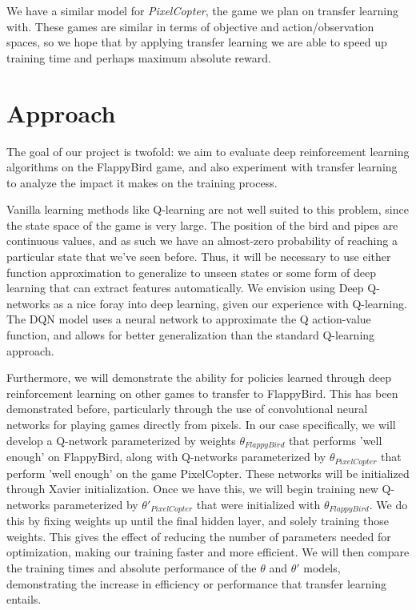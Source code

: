 \documentclass{article}
\begin{document}
We have a similar model for \textit{PixelCopter}, the game we plan on transfer learning with.
These games are similar in terms of objective and action/observation spaces, so we hope that by applying transfer learning we are able to speed up training time and perhaps maximum absolute reward.

\section{Approach}

The goal of our project is twofold: we aim to evaluate deep reinforcement learning algorithms on the FlappyBird game, and also experiment with transfer learning to analyze the impact it makes on the training process. 

Vanilla learning methods like Q-learning are not well suited to this problem, since the state space of the game is very large. The position of the bird and pipes are continuous values, and as such we have an almost-zero probability of reaching a particular state that we've seen before.
Thus, it will be necessary to use either function approximation to generalize to unseen states or some form of deep learning that can extract features automatically.
We envision using Deep Q-networks as a nice foray into deep learning, given our experience with Q-learning.
The DQN model uses a neural network to approximate the Q action-value function, and allows for better generalization than the standard Q-learning approach.

Furthermore, we will demonstrate the ability for policies learned through deep reinforcement learning on  other games to transfer to FlappyBird.
This has been demonstrated before, particularly through the use of convolutional neural networks for playing games directly from pixels. \cite{deepmind}
In our case specifically, we will develop a Q-network parameterized by weights $\theta_{FlappyBird}$ that performs 'well enough' on FlappyBird, along with Q-networks parameterized by $\theta_{PixelCopter}$ that perform 'well enough' on the game PixelCopter.
These networks will be initialized through Xavier initialization. \cite{xavier}
Once we have this, we will begin training new Q-networks parameterized by $\theta'_{PixelCopter}$ that were initialized with $\theta_{FlappyBird}$.
We do this by fixing weights up until the final hidden layer, and solely training those weights.
This gives the effect of reducing the number of parameters needed for optimization, making our training faster and more efficient.
We will then compare the training times and absolute performance of the $\theta$ and $\theta'$ models, demonstrating the increase in efficiency or performance that transfer learning entails.
\end{document}
